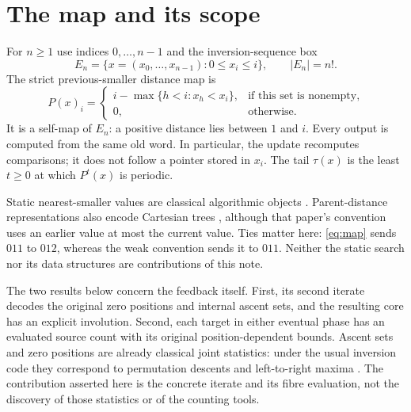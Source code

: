 \section{The map and its scope}
For $n\ge1$ use indices $0,\ldots,n-1$ and the inversion-sequence box
\begin{equation}\label{eq:carrier}
 E_n=\{x=(x_0,\ldots,x_{n-1}):0\le x_i\le i\},\qquad |E_n|=n!.
\end{equation}
The strict previous-smaller distance map is
\begin{equation}\label{eq:map}
 P(x)_i=
 \begin{cases}
 i-\max\{h<i:x_h<x_i\},&\text{if this set is nonempty},\\
 0,&\text{otherwise}.
 \end{cases}
\end{equation}
It is a self-map of $E_n$: a positive distance lies between $1$ and $i$.
Every output is computed from the same old word. In particular, the update
recomputes comparisons; it does not follow a pointer stored in $x_i$.
The tail $\tau(x)$ is the least $t\ge0$ at which $P^t(x)$ is periodic.

Static nearest-smaller values are classical algorithmic objects
\citep{Berkman1993Nearest}. Parent-distance representations also encode
Cartesian trees \citep{Park2019Cartesian}, although that paper's convention
uses an earlier value at most the current value. Ties matter here:
\eqref{eq:map} sends $011$ to $012$, whereas the weak convention sends
it to $011$. Neither the static search nor its data structures are
contributions of this note.

The two results below concern the feedback itself. First, its second
iterate decodes the original zero positions and internal ascent sets,
and the resulting core has an explicit involution. Second, each target
in either eventual phase has an evaluated source count with its original
position-dependent bounds. Ascent sets and zero positions are already
classical joint statistics: under the usual inversion code they correspond
to permutation descents and left-to-right maxima \citep{Lin2018Sextuple}.
The contribution asserted here is the concrete iterate and its fibre
evaluation, not the discovery of those statistics or of the counting tools.
